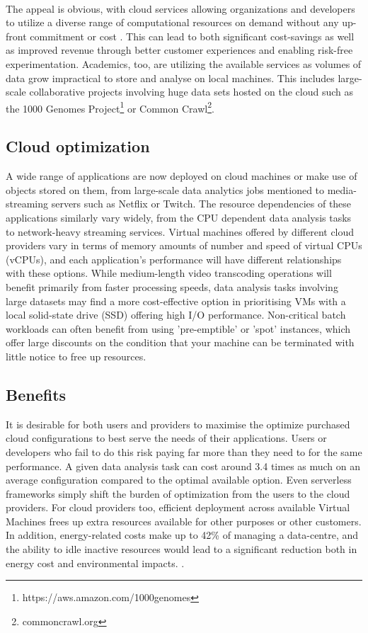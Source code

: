 \documentclass{report}
\begin{document}
\paragraph{}
The appeal is obvious, with cloud services allowing organizations and developers to utilize a diverse range of computational resources on demand without any up-front commitment or cost \cite{Armbrust2009}. This can lead to both significant cost-savings as well as improved revenue through better customer experiences and enabling risk-free experimentation\cite{Power2018}. Academics, too, are utilizing the available services as volumes of data grow impractical to store and analyse on local machines\cite{Berriman2013, Ruiz-Alvarez2011}. This includes large-scale collaborative projects involving huge data sets hosted on the cloud such as the 1000 Genomes Project\footnote{https://aws.amazon.com/1000genomes} or Common Crawl\footnote{commoncrawl.org}.

\subsection{Cloud optimization}
A wide range of applications are now deployed on cloud machines or make use of objects stored on them, from large-scale data analytics jobs mentioned to media-streaming servers such as Netflix or Twitch\cite{Bilal2017}. The resource dependencies of these applications similarly vary widely, from the CPU dependent data analysis tasks to network-heavy streaming services. Virtual machines offered by different cloud providers vary in terms of memory amounts of number and speed of virtual CPUs (vCPUs), and each application's performance will have different relationships with these options. While medium-length video transcoding operations will benefit primarily from faster processing speeds, data analysis tasks involving large datasets may find a more cost-effective option in prioritising VMs with a local solid-state drive (SSD) offering high I/O performance. Non-critical batch workloads can often benefit from using 'pre-emptible' or 'spot' instances, which offer large discounts on the condition that your machine can be terminated with little notice to free up resources.

\subsection{Benefits}
It is desirable for both users and providers to maximise the optimize purchased cloud configurations to best serve the needs of their applications. Users or developers who fail to do this risk paying far more than they need to for the same performance. A given data analysis task can cost around 3.4 times as much on an average configuration compared to the optimal available option\cite{Alipourfard2017}. Even serverless frameworks simply shift the burden of optimization from the users to the cloud providers. For cloud providers too, efficient deployment across available Virtual Machines frees up extra resources available for other purposes or other customers. In addition, energy-related costs make up to 42\% of managing a data-centre, and the ability to idle inactive resources would lead to a significant reduction both in energy cost and environmental impacts. \cite{Berl2010}.
\end{document}
